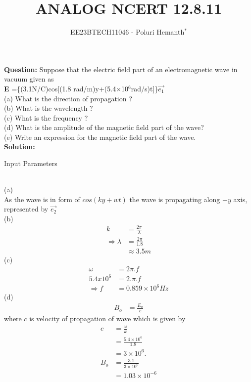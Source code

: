 \documentclass[journal,12pt,twocolumn]{IEEEtran}
\theoremstyle{remark}
\begin{document}

\vspace{3cm}

\title{ANALOG NCERT 12.8.11}
\author{EE23BTECH11046 - Poluri Hemanth$^{*}$}
\maketitle
\textbf{Question:}
Suppose that the electric field part of an electromagnetic wave
in vacuum given as\\ \textbf{E} =\{(3.1N/C)cos[(1.8 rad/m)y+(5.4$\times$10$^{6}$rad/s)t]\}$\vec{e_1}$ \\
(a) What is the direction of propagation ?\\
(b) What is the wavelength ? \\
(c) What is the frequency ?\\
(d) What is the amplitude of the magnetic field part of the wave?\\
(e) Write an expression for the magnetic field part of the wave.\\
\textbf{Solution:}
\begin{table}[h!]
    
    \caption{Input Parameters}
    \label{tab:12.8.11}
\end{table}\\
(a)\\
As the wave is in form of $cos(ky+wt)$
the wave is propagating along $-y$ axis, represented by $\vec{e_2}$\\
(b)
\begin{align}
	k&=\frac{2\pi}{\lambda} \\
	\Rightarrow\lambda&=\frac{2\pi}{1.8}\\
	&\approx3.5m
\end{align}
(c)
\begin{align} 
	\omega&=2\pi.f \\
	 5.4 x 10^{6} &=2.\pi.f \\
	\Rightarrow f &= 0.859 \times 10^{6} Hz    
\end{align}
(d)
\begin{align}
	B_o&=\frac{E_o}{c}
\end{align}
where $c$ is velocity of propagation of wave which is given by
\begin{align}
	c&=\frac{\omega}{k} \\
	&=\frac{5.4 \times 10^{6}}{1.8}\\
	&=3 \times 10^{6}.\\
	B_o&= \frac{3.1}{3 \times 10^{6}}\\
	&= 1.03 \times 10^{-6}\label{1}
\end{align}
\end{document}
